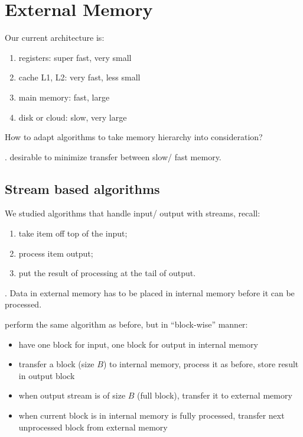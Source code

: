 \documentclass{article}
\begin{document}
\newpage

\section{External Memory} 

Our current architecture is: \begin{multicols}{2}
    \begin{enumerate}
        \item registers: super fast, very small  
        \item cache L1, L2: very fast, less small  
        \item main memory: fast, large  
        \item disk or cloud: slow,  very large
    \end{enumerate}
\end{multicols} 

\begin{Question}{}
    How to adapt algorithms to take memory hierarchy into consideration? 
    \begin{comm}[].
        desirable to minimize transfer between slow/ fast memory. 
    \end{comm}
\end{Question}

\subsection{Stream based algorithms} 

We studied algorithms that handle input/ output with streams, recall: 
\begin{enumerate}
    \item take item off top of the input; 
    \item process item output; 
    \item put the result of processing at the tail of output. 
\end{enumerate}

\begin{discovery}[].
    Data in external memory has to be  placed in internal memory before it can be processed. 
\end{discovery}

\begin{solution}
    perform the same algorithm as before, but in ``block-wise'' manner: 
    \begin{itemize}
        \item have one block for input, one block for output in internal memory 
        \item transfer a block (size $B$) to internal memory, process it as before, store result in output block 
        \item when output stream is of size $B$ (full block), transfer it to external memory 
        \item when current block is in internal memory is fully processed, transfer next unprocessed block from external memory
    \end{itemize}
\end{solution}
\end{document}
